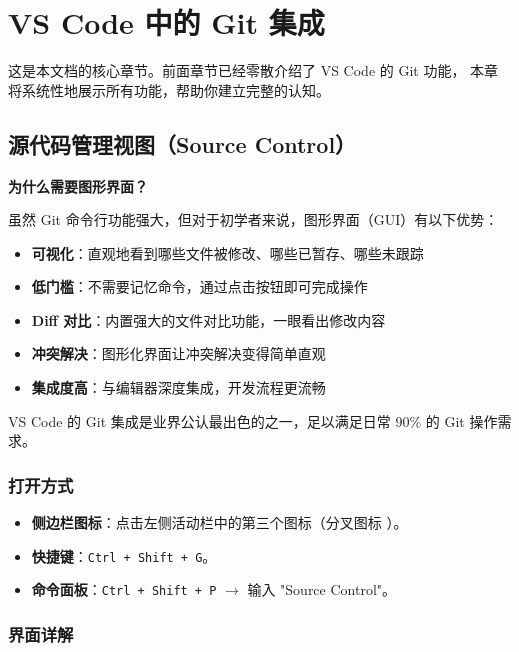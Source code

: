 \documentclass[12pt,a4paper,openany]{ctexbook}
\begin{document}
\chapter{VS Code 中的 Git 集成}

这是本文档的核心章节。前面章节已经零散介绍了 VS Code 的 Git 功能，
本章将系统性地展示所有功能，帮助你建立完整的认知。

\section{源代码管理视图（Source Control）}

\medskip
\textbf{为什么需要图形界面？}

虽然 Git 命令行功能强大，但对于初学者来说，图形界面（GUI）有以下优势：
\begin{itemize}
  \item \textbf{可视化}：直观地看到哪些文件被修改、哪些已暂存、哪些未跟踪
  \item \textbf{低门槛}：不需要记忆命令，通过点击按钮即可完成操作
  \item \textbf{Diff 对比}：内置强大的文件对比功能，一眼看出修改内容
  \item \textbf{冲突解决}：图形化界面让冲突解决变得简单直观
  \item \textbf{集成度高}：与编辑器深度集成，开发流程更流畅
\end{itemize}

VS Code 的 Git 集成是业界公认最出色的之一，足以满足日常 90\% 的 Git 操作需求。
\medskip

\subsection{打开方式}

\begin{itemize}[leftmargin=2em]
  \item \textbf{侧边栏图标}：点击左侧活动栏中的第三个图标（分叉图标 \faCodeBranch）。
  \item \textbf{快捷键}：\texttt{Ctrl + Shift + G}。
  \item \textbf{命令面板}：\texttt{Ctrl + Shift + P} $\to$ 输入 "Source Control"。
\end{itemize}

\subsection{界面详解}
\end{document}
